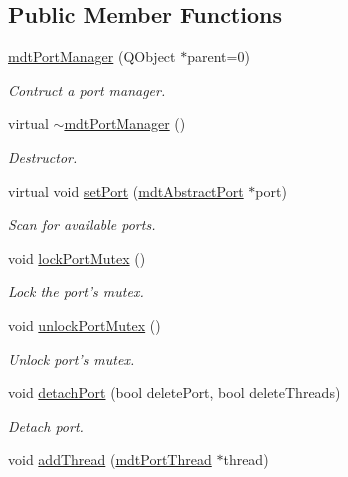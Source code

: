 \subsection*{Public Member Functions}
\begin{DoxyCompactItemize}
\item 
\hyperlink{classmdt_port_manager_a5ec36523089b7528d973e29cdbc64d01}{mdt\-Port\-Manager} (Q\-Object $\ast$parent=0)
\begin{DoxyCompactList}\small\item\em Contruct a port manager. \end{DoxyCompactList}\item 
virtual \hyperlink{classmdt_port_manager_adf797f8fd7a3ffdc000890a224e4c1b6}{$\sim$mdt\-Port\-Manager} ()
\begin{DoxyCompactList}\small\item\em Destructor. \end{DoxyCompactList}\item 
virtual void \hyperlink{classmdt_port_manager_afcd156b2d0c9d340999935efb6cd8cb6}{set\-Port} (\hyperlink{classmdt_abstract_port}{mdt\-Abstract\-Port} $\ast$port)
\begin{DoxyCompactList}\small\item\em Scan for available ports. \end{DoxyCompactList}\item 
void \hyperlink{classmdt_port_manager_a3107b7121dfe5b9686d9b3b3a48a0af0}{lock\-Port\-Mutex} ()
\begin{DoxyCompactList}\small\item\em Lock the port's mutex. \end{DoxyCompactList}\item 
void \hyperlink{classmdt_port_manager_a882e6bf95dac9cd4ab8cc93ecc524874}{unlock\-Port\-Mutex} ()
\begin{DoxyCompactList}\small\item\em Unlock port's mutex. \end{DoxyCompactList}\item 
void \hyperlink{classmdt_port_manager_a39cb4af4aedc0b6b7c4d4f53002c3fd1}{detach\-Port} (bool delete\-Port, bool delete\-Threads)
\begin{DoxyCompactList}\small\item\em Detach port. \end{DoxyCompactList}\item 
void \hyperlink{classmdt_port_manager_ab62591409d019a4a2576b4310c411b8f}{add\-Thread} (\hyperlink{classmdt_port_thread}{mdt\-Port\-Thread} $\ast$thread)

\end{DoxyCompactItemize}
